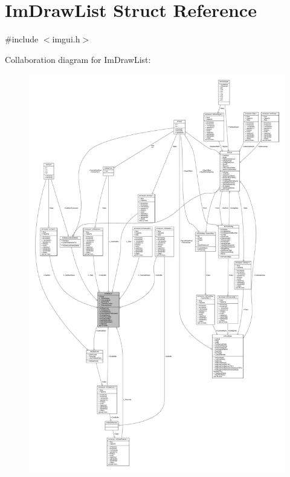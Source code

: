 \hypertarget{struct_im_draw_list}{}\section{Im\+Draw\+List Struct Reference}
\label{struct_im_draw_list}


{\ttfamily \#include $<$imgui.\+h$>$}



Collaboration diagram for Im\+Draw\+List\+:
\nopagebreak
\begin{figure}[H]
\begin{center}
\leavevmode
\includegraphics[width=350pt]{struct_im_draw_list__coll__graph}
\end{center}
\end{figure}
